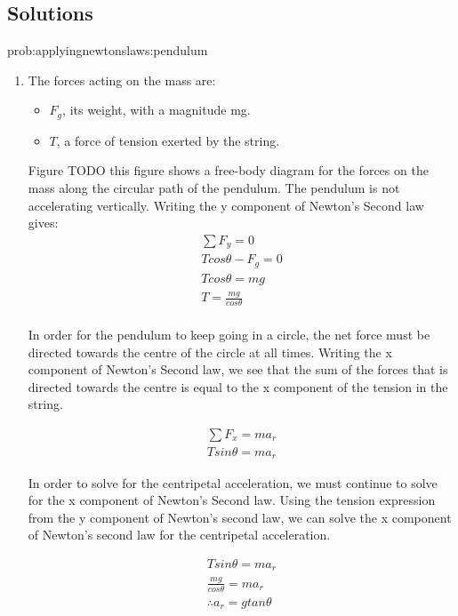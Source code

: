\newpage
\subsection{Solutions}

\begin{solution}{prob:applyingnewtonslaws:pendulum}\label{soln:applyingnewtonslaws:pendulum} 
\begin{enumerate}[label=\alph*)]
\item The forces acting on the mass are:
\begin{itemize}
\item $F_g$, its weight, with a magnitude mg.
\item $T$, a force of tension exerted by the string.
\end{itemize}

Figure TODO this figure shows a free-body diagram for the forces on the mass along the circular path of the pendulum. The pendulum is not accelerating vertically. Writing the y component of Newton's Second law gives:
\begin{align*}
\sum F_y=0 \\
Tcos\theta -F_g=0 \\
Tcos\theta=mg \\
T=\frac{mg}{cos\theta} \\
\end{align*}

In order for the pendulum to keep going in a circle, the net force must be directed towards the centre of the circle at all times. Writing the x component of Newton's Second law, we see that the sum of the forces that is directed towards the centre is equal to the x component of the tension in the string.

\begin{align*}
\sum F_x=ma_r \\
Tsin\theta=ma_r
\end{align*}

In order to solve for the centripetal acceleration, we must continue to solve for the x component of Newton's Second law. Using the tension expression from the y component of Newton's second law, we can solve the x component of Newton's second law for the centripetal acceleration.

\begin{align*}
Tsin\theta=ma_r \\
\frac{mg}{cos\theta}=ma_r \\
\therefore a_r=gtan\theta
\end{align*}


\end{enumerate}
\end{solution}
